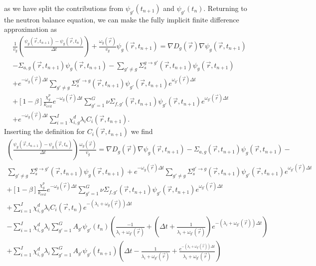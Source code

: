\documentclass[12pt]{report}
\begin{document}
	as we have split the contributions from $\psi_{g'}(t_{n+1})$ and $\psi_{g'}(t_{n})$. Returning to the neutron balance equation, we can make the fully implicit finite difference approximation as
	\begin{eqnarray}
		 \frac{1}{v_g} \left(\frac{\psi_g(\vec{r},t_{n+1}) - \psi_g(\vec{r},t_{n})}{\Delta t} \right) + \frac{\omega_g(\vec{r})}{v_g} \psi_g(\vec{r},t_{n+1})  = \nabla D_g(\vec{r}) \nabla \psi_g(\vec{r},t_{n+1}) \nonumber \\ - \Sigma_{a,g}(\vec{r},t_{n+1}) \psi_g(\vec{r},t_{n+1}) - \sum_{g'\neq g} \Sigma_{s}^{g\rightarrow g'} (\vec{r},t_{n+1}) \psi_g(\vec{r},t_{n+1}) \nonumber \\ + e^{-\omega_g(\vec{r}) \Delta t} \sum_{g' \neq g} \Sigma_{s}^{g'\rightarrow g} (\vec{r},t_{n+1}) \psi_{g'}(\vec{r},t_{n+1}) e^{\omega_{g'}(\vec{r}) \Delta t} \nonumber \\
		+ \left[ 1- \beta \right] \frac{\chi_g^p}{k_{crit}} e^{-\omega_g(\vec{r}) \Delta t} \sum_{g'=1}^{G} \nu \Sigma_{f,g'}(\vec{r},t_{n+1}) \psi_{g'}(\vec{r},t_{n+1}) e^{\omega_{g'}(\vec{r}) \Delta t} \nonumber \\ + e^{-\omega_g(\vec{r}) \Delta t} \sum_{i=1}^{I} \chi_{i,g}^d \lambda_i C_i(\vec{r},t_{n+1}) \nonumber.
	\end{eqnarray}
	Inserting the definition for $C_i(\vec{r},t_{n+1})$ we find
	\begin{eqnarray}
	\left(\frac{\psi_g(\vec{r},t_{n+1}) - \psi_g(\vec{r},t_{n})}{\Delta t} \right) \frac{\omega_g(\vec{r})}{v_g}  = \nabla D_g(\vec{r}) \nabla \psi_g(\vec{r},t_{n+1}) - \Sigma_{a,g}(\vec{r},t_{n+1}) \psi_g(\vec{r},t_{n+1}) -  \nonumber \\ \sum_{g'\neq g} \Sigma_{s}^{g\rightarrow g'} (\vec{r},t_{n+1}) \psi_g(\vec{r},t_{n+1}) + e^{-\omega_g(\vec{r}) \Delta t} \sum_{g' \neq g} \Sigma_{s}^{g'\rightarrow g} (\vec{r},t_{n+1}) \psi_{g'}(\vec{r},t_{n+1}) e^{\omega_{g'}(\vec{r}) \Delta t} \nonumber \\
	+ \left[ 1- \beta \right] \frac{\chi_g^p}{k_{crit}} e^{-\omega_g(\vec{r}) \Delta t} \sum_{g'=1}^{G} \nu \Sigma_{f,g'}(\vec{r},t_{n+1}) \psi_{g'}(\vec{r},t_{n+1}) e^{\omega_{g'}(\vec{r}) \Delta t} \nonumber \\ +  \sum_{i=1}^{I} \chi_{i,g}^d \lambda_i C_i(\vec{r},t_{n}) e^{-\left(\lambda_i + \omega_g(\vec{r})\right) \Delta t} \nonumber \\
	- \sum_{i=1}^{I} \chi_{i,g}^d \lambda_i \sum_{g'=1}^{G} A_{g'} \psi_{g'}(t_n) \left( \frac{-1}{\lambda_i + \omega_{g'}(\vec{r})} + \left(\Delta t + \frac{1}{\lambda_i + \omega_{g'}(\vec{r})} \right)e^{-\left(\lambda_i + \omega_{g'}(\vec{r}) \right) \Delta t} \right) \nonumber \\
	+ \sum_{i=1}^{I} \chi_{i,g}^d \lambda_i \sum_{g'=1}^{G} A_{g'} \psi_{g'}(t_{n+1}) \left( \Delta t - \frac{1}{\lambda_i + \omega_{g'}(\vec{r})} + \frac{e^{-\left( \lambda_i + \omega_{g'}(\vec{r}) \right) \Delta t}}{\lambda_i + \omega_{g'}(\vec{r})} \right)
	\nonumber
	\end{eqnarray}
\end{document}
